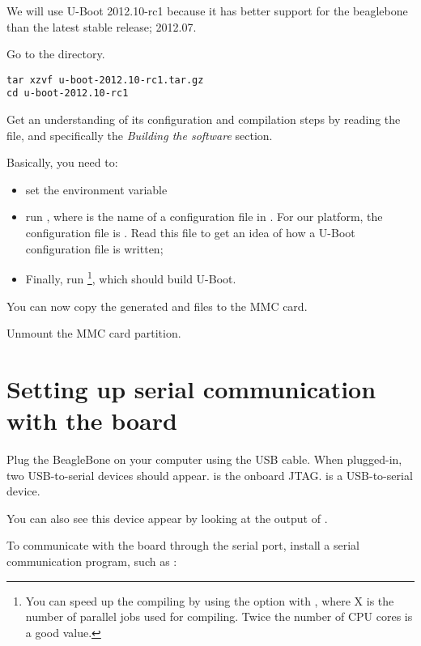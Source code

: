 We will use U-Boot 2012.10-rc1 because it has better support for the beaglebone than the latest stable release; 2012.07.

Go to the  directory.

\begin{verbatim}
tar xzvf u-boot-2012.10-rc1.tar.gz
cd u-boot-2012.10-rc1
\end{verbatim}

Get an understanding of its configuration and compilation steps by
reading the  file, and specifically the {\em Building the
  software} section.

Basically, you need to:

\begin{itemize}

\item set the  environment variable

\item run , where  is the name
  of a configuration file in . For our
  platform, the configuration file is
  . Read this file to get an idea of
  how a U-Boot configuration file is written;

\item Finally, run \footnote{You can speed up the compiling
  by using the  option with , where X is the number of parallel
  jobs used for compiling. Twice the number of CPU cores is a good
  value.}, which should build U-Boot.

\end{itemize}

You can now copy the generated  and  files to the MMC card.

Unmount the MMC card partition.

\section{Setting up serial communication with the board}

Plug the BeagleBone on your computer using the USB cable.
When plugged-in, two USB-to-serial devices should appear.
 is the onboard JTAG.
 is a USB-to-serial device.

You can also see this device appear by looking at the output of
.

To communicate with the board through the serial port, install a
serial communication program, such as :

